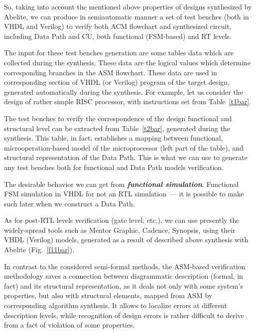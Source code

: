 \begin{multicols}{2}

So, taking into account the mentioned above properties of designs synthesized by Abelite, we can produce
in semiautomatic manner a set of test benches (both in VHDL and Verilog) to verify both ACM flowchart and
synthesized circuit, including Data Path and CU, both functional (FSM-based) and RT levels.

   The input for these test benches generation are some tables data which are collected during the synthesis.
These data are the logical values which determine corresponding branches in the ASM flowchart. These data are
used in corresponding section of VHDL (or Verilog) program of the target design, generated automatically
during the synthesis. For example, let us consider the design of rather simple RISC processor, with instructions
set from Table~\ref{t1bar}.



   The test benches to verify the correspondence of the design functional
and structural level can be extracted
from Table~\ref{t2bar}, generated during the synthesis.
This table, in fact, establishes a mapping between functional, microoperation-based model of the
microprocessor (left part of the table), and structural representation of the Data Path. This is what we can use to
generate any test benches both for functional and Data Path models verification.


The desirable behavior we can get from {\bfseries\textit{functional simulation}}. Functional FSM
simulation in VHDL for not an RTL simulation~--- it is possible to make such later when we
construct a Data Path.

   As for post-RTL levels verification (gate level, etc.),
we can use presently the widely-spread tools such as
Mentor Graphic, Cadence, Synopsis, using their VHDL (Verilog) models, generated as a result of described
above synthesis with Abelite (Fig.~\ref{f11bar}).

In contrast to the considered semi-formal methods, the ASM-based verification methodology saves a
connection between diagrammatic description (formal, in fact) and its structural representation, as it deals not
only with some system's properties, but also with structural elements, mapped from ASM by corresponding
algorithm synthesis. It allows to localize errors at different description levels, while recognition of design errors
is rather difficult to derive from a fact of violation of some properties.


\end{multicols}
